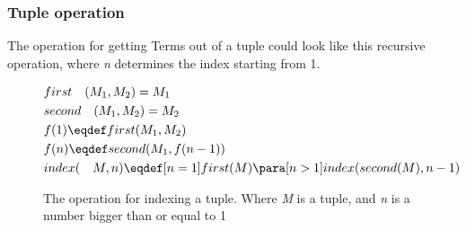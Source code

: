 \subsubsection{Tuple operation}
The operation for getting Terms out of a tuple could look like this recursive operation, where \textit{n} determines the index starting from 1.
\begin{figure}[h]
    \begin{align*}
        &first \quad (M_1, M_2) = M_1\\
        &second \quad (M_1, M_2) = M_2\\
        &f(1) \eqdef first(M_1, M_2)\\
        &f(n) \eqdef second(M_1, f(n-1))\\
        &index( \quad M, n) \eqdef [n = 1]first(M)\para [n > 1]index(second(M), n-1)
    \end{align*}
    \caption{The operation for indexing a tuple. Where \textit{M} is a tuple, and \textit{n} is a number bigger than  or equal to 1}
\end{figure}
\FloatBarrier
